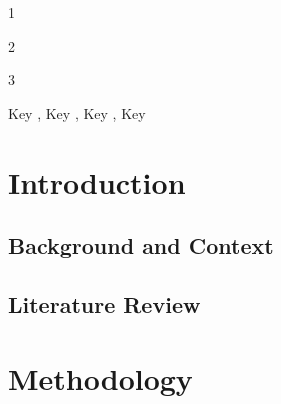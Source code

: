\begin{frontmatter}
    \begin{highlights}
		\item 1 %
		\item 2 %
		\item 3 %
    \end{highlights}

    \begin{keyword}
        Key \sep
        Key \sep
        Key \sep
        Key %
    \end{keyword}

\end{frontmatter}


\section{Introduction}
\label{sec:Introduction}


\subsection{Background and Context}



\subsection{Literature Review}



\section{Methodology}\label{sec:Methodology}



